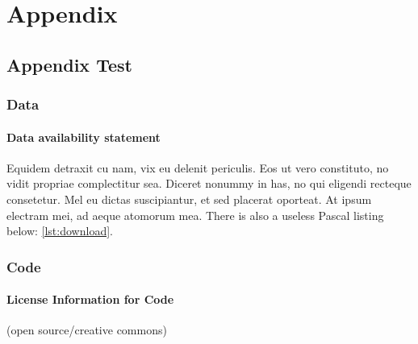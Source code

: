 \normalsize %
\setlength{\parindent}{0cm}%
\setlength{\leftskip}{0cm}%
\appendix
\cleardoublepage
\part{Appendix}


\chapter{Appendix Test}

\section{Data}

\subsection{Data availability statement}

Equidem detraxit cu nam, vix eu delenit periculis. Eos ut vero
constituto, no vidit propriae complectitur sea. Diceret nonummy in
has, no qui eligendi recteque consetetur. Mel eu dictas suscipiantur,
et sed placerat oporteat. At ipsum electram mei, ad aeque atomorum
mea. There is also a useless Pascal listing below: \autoref{lst:download}.

\section{Code}

\subsection{License Information for Code}
(open source/creative commons)





